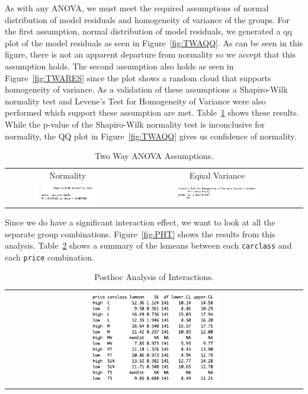 \documentclass[acmsmall]{acmart}
\begin{document}
As with any ANOVA, we must meet the required assumptions of normal distribution of model residuals and homogeneity of variance of the groups. For the first assumption, normal distribution of model residuals, we generated a qq plot of the model residuals as seen in Figure~\ref{fig:TWAQQ}. As can be seen in this figure, there is not an apparent departure from normality so we accept that this assumption holds. The second assumption also holds as seen in Figure~\ref{fig:TWARES} since the plot shows a random cloud that supports homogeneity of variance. As a validation of these assumptions a Shapiro-Wilk normality test and Levene's Test for Homogeneity of Variance were also performed which support these assumption are met. Table~\ref{fig:TWAASS} shows these results. While the p-value of the Shapiro-Wilk normality test is inconclusive for normality, the QQ plot in Figure~\ref{fig:TWAQQ} gives us confidence of normality.
\begin{table}[h]
\centering
\begin{tabular}{p{} p{}}
	\hline
	\multicolumn{1}{|c|}{Normality} & \multicolumn{1}{|c|}{Equal Variance} \\
		\multicolumn{1}{|c|}{\includegraphics[width=0.48\textwidth]{../graphics/TWAshap}} &
		\multicolumn{1}{|c|}{\includegraphics[width=0.48\textwidth]{../graphics/TWALev}}\\
		\hline
	\end{tabular}		
	\caption{Two Way ANOVA Assumptions.} %
	\label{fig:TWAASS}
\end{table}
 Since we do have a significant interaction effect, we want to look at all the separate group combinations. Figure~\ref{fig:PHT} shows the results from this analysis. Table~\ref{fig:TWALS} shows a summary of the lsmeans between each \texttt{carclass} and each \texttt{price} combination. 
 \begin{table}[h]
\centering
\begin{tabular}{p{}}
	\hline
	\multicolumn{1}{|c|}{}\\
		\multicolumn{1}{|c|}{\includegraphics[width=0.45\textwidth]{../graphics/TWAls}}\\
		\hline
	\end{tabular}		
	\caption{Posthoc Analysis of Interactions.} %
	\label{fig:TWALS}
\end{table}
\end{document}

